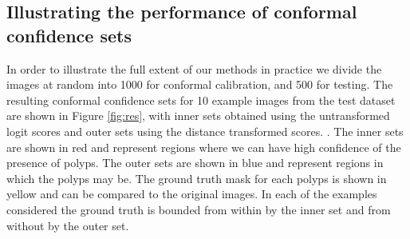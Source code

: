 \subsection{Illustrating the performance of conformal confidence sets}\label{SS:val}
In order to illustrate the full extent of our methods in practice we divide the  images at random into 1000 for conformal calibration, and 500 for testing. The resulting conformal confidence sets for 10 example images from the test dataset are shown in Figure \ref{fig:res}, with inner sets obtained using the untransformed logit scores and outer sets using the distance transformed scores. . The inner sets are shown in red and represent regions where we can have high confidence of the presence of polyps. The outer sets are shown in blue and represent regions in which the polyps may be. The ground truth mask for each polyps is shown in yellow and can be compared to the original images. In each of the examples considered the ground truth is bounded from within by the inner set and from without by the outer set. 
